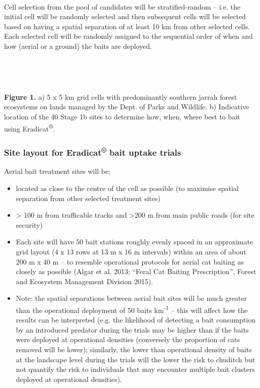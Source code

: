 \documentclass[version=last,
    paper=a4,                               %
    10pt,                                   %
    dvipsnames,
    oneside,                              %
    headings=openany,                       %
    open=any,
    BCOR=7mm,                               %
    DIV=15,     %
]{scrbook}
\begin{document}
~

Cell selection from the pool of candidates will be stratified-random --
i.e. the initial cell will be randomly selected and then subsequent
cells will be selected based on having a spatial separation of at least
10 km from other selected cells. Each selected cell will be randomly
assigned to the sequential order of when and how (aerial or a ground)
the baits are deployed.

~

~

\textbf{Figure 1.} a) 5 x 5 km grid cells with predominantly southern
jarrah forest ecosystems on lands managed by the Dept. of Parks and
Wildlife. b) Indicative location of the 40 Stage 1b sites to determine
how, when, where best to bait using Eradicat\textsuperscript{®}.

\subsubsection{Site layout for Eradicat\textsuperscript{®} bait uptake
trials}

Aerial bait treatment sites will be;

\begin{itemize}
\itemsep1pt\parskip0pt
\item
  located as close to the centre of the cell as possible (to maximise
  spatial separation from other selected treatment sites)
\item
  \textgreater{} 100 m from trafficable tracks and \textgreater{}200 m
  from main public roads (for site security)
\item
  Each site will have 50 bait stations roughly evenly spaced in an
  approximate grid layout (4 x 13 rows at 13 m x 16 m intervals) within
  an area of about 200 m x 40 m -- to resemble operational protocols for
  aerial cat baiting as closely as possible (Algar et al. 2013; ``Feral
  Cat Baiting Prescription'', Forest and Ecosystem Management Division
  2015).
\item
  Note: the spatial separations between aerial bait sites will be much
  greater than the operational deployment of 50 baits
  km\textsuperscript{-1} -- this will affect how the results can be
  interpreted (e.g. the likelihood of detecting a bait consumption by an
  introduced predator during the trials may be higher than if the baits
  were deployed at operational densities (conversely the proportion of
  cats removed will be lower); similarly, the lower than operational
  density of baits at the landscape level during the trials will the
  lower the risk to chuditch but not quantify the risk to individuals
  that may encounter multiple bait clusters deployed at operational
  densities).
\end{itemize}
\end{document}
